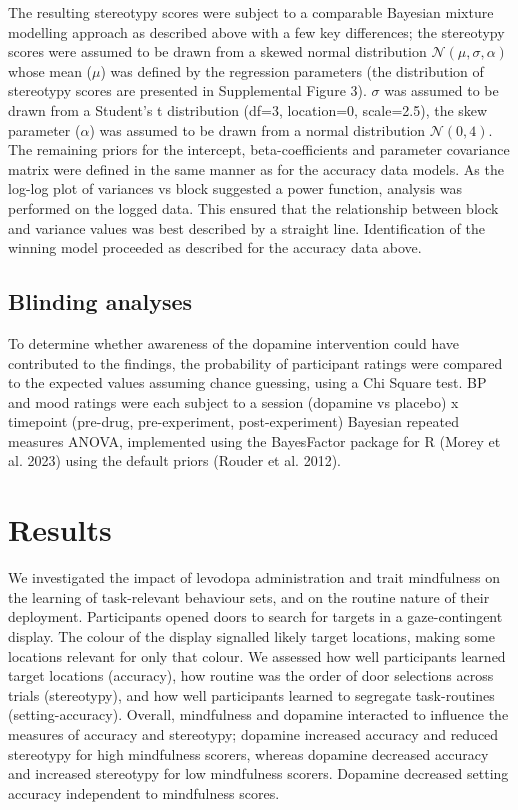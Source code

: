 \documentclass{article}
\begin{document}
The resulting stereotypy scores were subject to a comparable Bayesian
mixture modelling approach as described above with a few key
differences; the stereotypy scores were assumed to be drawn from a
skewed normal distribution \(\mathcal{N}(\mu, \sigma, \alpha)\) whose
mean (\(\mu\)) was defined by the regression parameters (the
distribution of stereotypy scores are presented in Supplemental Figure
3). \(\sigma\) was assumed to be drawn from a Student's t distribution
(df=3, location=0, scale=2.5), the skew parameter (\(\alpha\)) was
assumed to be drawn from a normal distribution \(\mathcal{N}(0,4)\). The
remaining priors for the intercept, beta-coefficients and parameter
covariance matrix were defined in the same manner as for the accuracy
data models. As the log-log plot of variances vs block suggested a power
function, analysis was performed on the logged data. This ensured that
the relationship between block and variance values was best described by
a straight line. Identification of the winning model proceeded as
described for the accuracy data above.

\hypertarget{blinding-analyses}{%
\subsection{Blinding analyses}\label{blinding-analyses}}

To determine whether awareness of the dopamine intervention could have
contributed to the findings, the probability of participant ratings were
compared to the expected values assuming chance guessing, using a Chi
Square test. BP and mood ratings were each subject to a session
(dopamine vs placebo) x timepoint (pre-drug, pre-experiment,
post-experiment) Bayesian repeated measures ANOVA, implemented using the
BayesFactor package for R (Morey et al. 2023) using the default priors
(Rouder et al. 2012).

\hypertarget{results}{%
\section{Results}\label{results}}

We investigated the impact of levodopa administration and trait
mindfulness on the learning of task-relevant behaviour sets, and on the
routine nature of their deployment. Participants opened doors to search
for targets in a gaze-contingent display. The colour of the display
signalled likely target locations, making some locations relevant for
only that colour. We assessed how well participants learned target
locations (accuracy), how routine was the order of door selections
across trials (stereotypy), and how well participants learned to
segregate task-routines (setting-accuracy). Overall, mindfulness and
dopamine interacted to influence the measures of accuracy and
stereotypy; dopamine increased accuracy and reduced stereotypy for high
mindfulness scorers, whereas dopamine decreased accuracy and increased
stereotypy for low mindfulness scorers. Dopamine decreased setting
accuracy independent to mindfulness scores.
\end{document}
